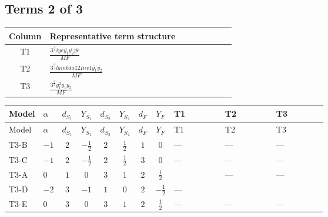 \documentclass[8pt]{article}
\begin{document}
\begin{landscape}
\subsection*{Terms 2 of 3}
\begin{center}
\begin{tabular}{@{}c >{\raggedright\arraybackslash}p{0.82\linewidth}@{}}
\toprule
Column & Representative term structure \\
\midrule
T1 & \(\displaystyle \frac{3^{\frac{3}{4}} i ye \overline{y_{1}} \overline{y_{2}} \overline{ye}}{MF}\) \\
\midrule
T2 & \(\displaystyle \frac{3^{\frac{3}{4}} lambda12Inv1 \overline{y_{1}} \overline{y_{2}}}{MF}\) \\
\midrule
T3 & \(\displaystyle \frac{3^{\frac{3}{4}} g_{1}^{2} \overline{y_{1}} \overline{y_{2}}}{MF}\) \\
\midrule
\bottomrule
\end{tabular}
\end{center}
\smallskip
\tiny
\begin{longtable}{@{}llcccccc >{\raggedright\arraybackslash}p{0.21\linewidth} >{\raggedright\arraybackslash}p{0.21\linewidth} >{\raggedright\arraybackslash}p{0.21\linewidth}@{}}
\toprule
Model & $\alpha$ & $d_{S_1}$ & $Y_{S_1}$ & $d_{S_2}$ & $Y_{S_2}$ & $d_F$ & $Y_F$ & T1 & T2 & T3 \\
\midrule
\endfirsthead
\toprule
Model & $\alpha$ & $d_{S_1}$ & $Y_{S_1}$ & $d_{S_2}$ & $Y_{S_2}$ & $d_F$ & $Y_F$ & T1 & T2 & T3 \\
\midrule
\endhead
T3-B & $-1$ & $2$ & $-\frac{1}{2}$ & $2$ & $\frac{1}{2}$ & $1$ & $0$ & --- & --- & --- \\
\midrule
T3-C & $-1$ & $2$ & $-\frac{1}{2}$ & $2$ & $\frac{1}{2}$ & $3$ & $0$ & --- & --- & --- \\
\midrule
T3-A & $0$ & $1$ & $0$ & $3$ & $1$ & $2$ & $\frac{1}{2}$ & \scriptsize\adjustbox{max width=\linewidth}{$\begin{gathered} \frac{3^{\frac{3}{4}} i ye \overline{y_{1}} \overline{y_{2}} \overline{ye}}{12 MF}\end{gathered}$} & --- & --- \\
\midrule
T3-D & $-2$ & $3$ & $-1$ & $1$ & $0$ & $2$ & $-\frac{1}{2}$ & --- & \scriptsize\adjustbox{max width=\linewidth}{$\begin{gathered} \frac{3^{\frac{3}{4}} lambda12Inv1 \overline{y_{1}} \overline{y_{2}}}{6 MF}\end{gathered}$} & \scriptsize\adjustbox{max width=\linewidth}{$\begin{gathered} \frac{3^{\frac{3}{4}} g_{1}^{2} \overline{y_{1}} \overline{y_{2}}}{8 MF}\end{gathered}$} \\
\midrule
T3-E & $0$ & $3$ & $0$ & $3$ & $1$ & $2$ & $\frac{1}{2}$ & --- & --- & --- \\
\midrule
\bottomrule
\end{longtable}
\clearpage

\end{landscape}
\end{document}
